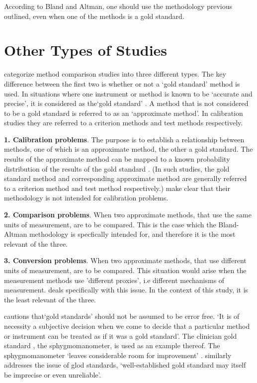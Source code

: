 	
	
	
	According to Bland and Altman, one should use the methodology
	previous outlined, even when one of the methods is a gold standard.
	
  
	\newpage
	\section{Other Types of Studies}
	\citet{lewis} categorize method comparison studies into three	different types.  The key difference between the first two is
	whether or not a `gold standard' method is used. In situations where one instrument or method is known to be `accurate and
	precise', it is considered as the`gold standard' \citep{lewis}. A	method that is not considered to be a gold standard is referred to
	as an `approximate method'. In calibration studies they are	referred to a criterion methods and test methods respectively.
	
	
	\textbf{1. Calibration problems}. The purpose is to establish a	relationship between methods, one of which is an approximate
	method, the other a gold standard. The results of the approximate	method can be mapped to a known probability distribution of the
	results of the gold standard \citep{lewis}. (In such studies, the	gold standard method and corresponding approximate method are
	generally referred to a criterion method and test method respectively.) \citet*{BA83} make clear that their methodology is
	not intended for calibration problems.
	
	\bigskip \textbf{2. Comparison problems}. When two approximate methods, that use the same units of measurement, are to be
	compared. This is the case which the Bland-Altman methodology is specfically intended for, and therefore it is the most relevant of
	the three.
	
	\bigskip \textbf{3. Conversion problems}. When two approximate methods, that use different units of measurement, are to be
	compared. This situation would arise when the measurement methods	use 'different proxies', i.e different mechanisms of measurement.
	\citet{lewis} deals specifically with this issue. In the context of this study, it is the least relevant of the three.
	
	\citet[p.47]{DunnSEME} cautions that`gold standards' should not be
	assumed to be error free. `It is of necessity a subjective decision when we come to decide that a particular method or
	instrument can be treated as if it was a gold standard'. The clinician gold standard , the sphygmomanometer, is used as an
	example thereof.  The sphygmomanometer `leaves considerable room for improvement' \citep{DunnSEME}. \citet{pizzi} similarly
	addresses the issue of glod standards, `well-established gold	standard may itself be imprecise or even unreliable'.
	
